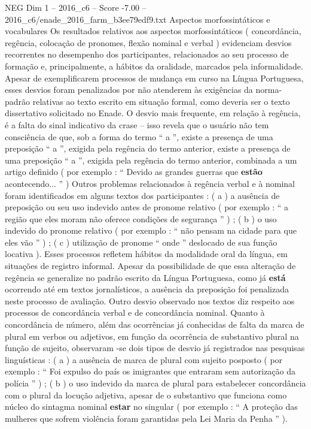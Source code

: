 \begin{textsample}{NEG Dim 1 – 2016\_c6 – Score -7.00 – 2016\_c6/enade\_2016\_farm\_b3ee79edf9.txt}
Aspectos morfossintáticos e vocabulares Os resultados relativos aos aspectos morfossintáticos ( concordância, regência, colocação de pronomes, flexão nominal e verbal ) evidenciam desvios recorrentes no desempenho dos participantes, relacionados ao seu processo de formação e, principalmente, a hábitos da oralidade, marcados pela informalidade.
Apesar de exemplificarem processos de mudança em curso na Língua Portuguesa, esses desvios foram penalizados por não atenderem às exigências da norma-padrão relativas ao texto escrito em situação formal, como deveria ser o texto dissertativo solicitado no Enade.
O desvio mais frequente, em relação à regência, é a falta do sinal indicativo da crase – isso revela que o usuário não tem consciência de que, sob a forma do termo “ a ”, existe a presença de uma preposição “ a ”, exigida pela regência do termo anterior, existe a presença de uma preposição “ a ”, exigida pela regência do termo anterior, combinada a um artigo definido ( por exemplo : “ Devido as grandes guerras que \textbf{estão} acontecendo... ” ) Outros problemas relacionados à regência verbal e à nominal foram identificados em alguns textos dos participantes : ( a ) a ausência de preposição ou seu uso indevido antes de pronome relativo ( por exemplo : “ a região que eles moram não oferece condições de segurança ” ) ; ( b ) o uso indevido do pronome relativo ( por exemplo : “ não pensam na cidade para que eles vão ” ) ; ( c ) utilização de pronome “ onde ” deslocado de sua função locativa ).
Esses processos refletem hábitos da modalidade oral da língua, em situações de registro informal.
Apesar da possibilidade de que essa alteração de regência se generalize no padrão escrito da Língua Portuguesa, como já \textbf{está} ocorrendo até em textos jornalísticos, a ausência da preposição foi penalizada neste processo de avaliação.
Outro desvio observado nos textos diz respeito aos processos de concordância verbal e de concordância nominal.
Quanto à concordância de número, além das ocorrências já conhecidas de falta da marca de plural em verbos ou adjetivos, em função da ocorrência de substantivo plural na função de sujeito, observaram -se dois tipos de desvio já registrados nas pesquisas linguísticas : ( a ) a ausência de marca de plural com sujeito posposto ( por exemplo : “ Foi expulso do país os imigrantes que entraram sem autorização da polícia ” ) ; ( b ) o uso indevido da marca de plural para estabelecer concordância com o plural da locução adjetiva, apesar de o substantivo que funciona como núcleo do sintagma nominal \textbf{estar} no singular ( por exemplo : “ A proteção das mulheres que sofrem violência foram garantidas pela Lei Maria da Penha ” ).

\end{textsample}
